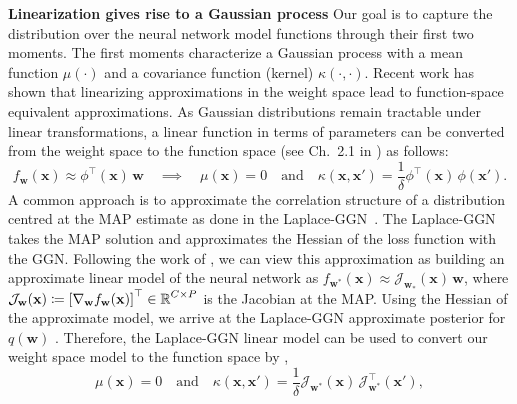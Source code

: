 \documentclass{article}
\newcommand{\weights}{\ensuremath{\mathbf{w}}}
\newcommand{\mbf}[1]{\mathbf{#1}}
\newcommand{\T}{\top}
\newcommand{\vx}{\mbf{x}}
\newcommand{\vw}{\mbf{w}}
\newcommand{\Jac}[2]{\mathcal{J}_{#1}(#2)}
\newcommand{\JacT}[2]{\mathcal{J}_{#1}^\top(#2)}
\newcommand{\GP}{\mathcal{GP}}
\begin{document}
\textbf{Linearization gives rise to a Gaussian process}
Our goal is to capture the distribution over the neural network model functions through their first two moments. The first moments characterize a Gaussian process with a mean function $\mu(\cdot)$ and a covariance function (kernel) $\kappa(\cdot,\cdot)$. 
Recent work \cite{khan2019approximate,maddox2021fast} has shown that linearizing approximations in the weight space lead to function-space equivalent approximations.
As Gaussian distributions remain tractable under linear transformations, a linear function in terms of parameters can be converted from the weight space to the function space (see Ch.~2.1 in \cite{rasmussen2006gaussian}) as follows:
%
\begin{equation} \label{eq:weight_func}
f_\weights(\vx) \approx 
\phi^\top\!(\vx) \, \vw \quad\implies\quad \mu(\vx) = 0 \quad \text{and} \quad \kappa(\vx, \vx') = \frac{1}{\delta} \phi^\T\!(\vx) \, \phi(\vx').
\end{equation}
A common approach is to approximate the correlation structure of a distribution centred at the MAP estimate as done in the Laplace-GGN~\cite{khan2019approximate, daxberger2021laplace, maddox2021fast}. 
The Laplace-GGN takes the MAP solution and approximates the Hessian of the loss function
with the GGN.
Following the work of \citet{khan2019approximate}, we can view this approximation as building an approximate linear model of the neural network as $f_{\weights^*}(\vx) \approx 
\Jac{\weights_*}{\vx} \, \weights$, where $\Jac{\weights}{\vx} \coloneqq \left[ \nabla_\weights f_\weights(\vx)\right]^\top \in \R^{C \times P}$ is the Jacobian at the MAP.
Using the Hessian of the approximate model, we arrive at the Laplace-GGN approximate posterior for $q(\vw)$ . 
Therefore, the Laplace-GGN linear model can be used to convert our weight space model to the function space by ,
\begin{equation} 
\label{eq-laplace-approx-function-space} 
  \mu(\vx) =  0 \quad \text{and} \quad
  \kappa(\vx, \vx')
  = \frac{1}{\delta} \Jac{\weights^*}{\vx} \, \JacT{\weights^*}{\vx'}, 
\end{equation}
\end{document}
